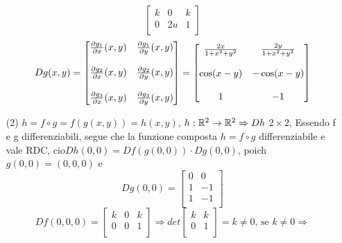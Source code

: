\begin{eexercise}[Es 2, Provetta]
\begin{itemize}
$$\begin{bmatrix}
                k & 0 & k \\
                0 & 2u & 1 \\
              \end{bmatrix}$$
              $$D g(x,y) = \begin{bmatrix}
                \frac{\partial g_1}{\partial x }(x,y) & \frac{\partial g_1}{\partial y }(x,y) \\
                \\
                \frac{\partial g_2}{\partial x }(x,y) & \frac{\partial g_2}{\partial y }(x,y) \\
                \\
                \frac{\partial g_3}{\partial x }(x,y) & \frac{\partial g_3}{\partial y }(x,y) \\
              \end{bmatrix} = \begin{bmatrix}
                \frac{2x}{1+x^2+y^2} & \frac{2y}{1+x^2+y^2} \\
                \\
                \cos(x-y) & -\cos(x-y) \\
                \\
                1 & -1 \\
              \end{bmatrix}$$
    \item[(2)] $h = f \circ g = f(g (x,y)) = h(x,y)$, $h : \mathbb{R}^2 \to \mathbb{R}^2 \Rightarrow Dh $ \ace $2\times 2$,
              Essendo f e g differenziabili, segue che la funzione composta $h = f\circ g$ \ace differenziabile e 
              vale RDC, cio\ace $D h(0,0) = D f(g(0,0)) \cdot D g(0,0)$, poich\ace 
              $g(0,0)=(0,0,0)$ e $$D g(0,0) = \begin{bmatrix}
                0 & 0 \\ 
                1 & -1 \\
                1 & -1 \\
              \end{bmatrix}$$
              $$D f(0,0,0) = \begin{bmatrix}
                k & 0 & k \\
                0 & 0 & 1 \\
              \end{bmatrix} \Rightarrow det\begin{bmatrix}
                k & k \\
                0 & 1 \\ 
              \end{bmatrix} = k \neq 0 \text{, se } k \neq 0 \Rightarrow$$

\end{itemize}
\end{eexercise}
